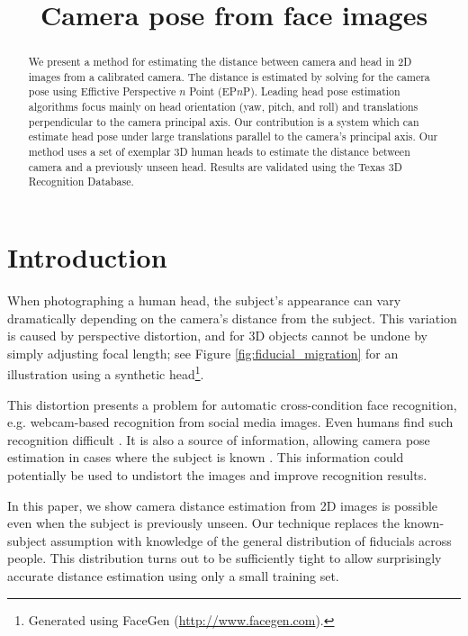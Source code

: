 \documentclass[runningheads]{llncs}
\begin{document}
\pagestyle{headings}

\mainmatter

\title{Camera pose from face images}


\maketitle

\begin{abstract}
We present a method for estimating the distance between camera and head in 2D images from a calibrated camera.  The distance is estimated by solving for the camera pose using Effictive Perspective $n$ Point (EP$n$P).  Leading head pose estimation algorithms focus mainly on head orientation (yaw, pitch, and roll) and translations perpendicular to the camera principal axis.  Our contribution is a system which can estimate head pose under large translations parallel to the camera's principal axis.  Our method uses a set of exemplar 3D human heads to estimate the distance between camera and a previously unseen head.  Results are validated using the Texas 3D Recognition Database.
\end{abstract}

\section{Introduction}
When photographing a human head, the subject's appearance can vary dramatically depending on the camera's distance from the subject.
This variation is caused by perspective distortion, and for 3D objects cannot be undone by simply adjusting focal length; see Figure \ref{fig:fiducial_migration} for an illustration using a synthetic head\footnote{Generated using FaceGen (\url{http://www.facegen.com}).}.

This distortion presents a problem for automatic cross-condition face recognition, e.g. webcam-based recognition from social media images.
Even humans find such recognition difficult \cite{liu2003face,liu2006face}.
It is also a source of information, allowing camera pose estimation in cases where the subject is known \cite{ohayon2006robust}.
This information could potentially be used to undistort the images and improve recognition results.

In this paper, we show camera distance estimation from 2D images is possible even when the subject is previously unseen.
Our technique replaces the known-subject assumption with knowledge of the general distribution of fiducials across people.
This distribution turns out to be sufficiently tight to allow surprisingly accurate distance estimation using only a small training set.
\end{document}
